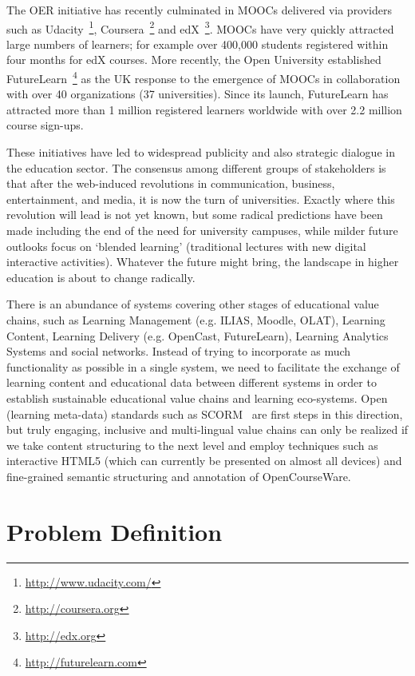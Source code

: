 \documentclass[ngerman,UKenglish,table]{scrbook}
\begin{document}
The OER initiative has recently culminated in MOOCs delivered via providers such as Udacity~\footnote{\url{http://www.udacity.com/}}, Coursera~\footnote{\url{http://coursera.org}} and edX~\footnote{\url{http://edx.org}}.
MOOCs have very quickly attracted large numbers of learners; for example over 400,000 students registered within four months for edX courses.
More recently, the Open University established FutureLearn~\footnote{\url{http://futurelearn.com}} as the UK response to the emergence of MOOCs in collaboration with over 40 organizations (37 universities).
Since its launch, FutureLearn has attracted more than 1 million registered learners worldwide with over 2.2 million course sign-ups. 

These initiatives have led to widespread publicity and also strategic dialogue in the education sector.
The consensus among different groups of stakeholders is that after the web-induced revolutions in communication, business, entertainment, and media, it is now the turn of universities.
Exactly where this revolution will lead is not yet known, but some radical predictions have been made including the end of the need for university campuses, while milder future outlooks focus on ‘blended learning’ (traditional lectures with new digital interactive activities).
Whatever the future might bring, the landscape in higher education is about to change radically.

There is an abundance of systems covering other stages of educational value chains, such as Learning Management (e.g. ILIAS, Moodle, OLAT), Learning Content, Learning Delivery (e.g. OpenCast, FutureLearn), Learning Analytics Systems and social networks.
Instead of trying to incorporate as much functionality as possible in a single system, we need to facilitate the exchange of learning content and educational data between different systems in order to establish sustainable educational value chains and learning eco-systems.
Open (learning meta-data) standards such as SCORM~\cite{scorm_specification2011} are first steps in this direction, but truly engaging, inclusive and multi-lingual value chains can only be realized if we take content structuring to the next level and employ techniques such as interactive HTML5 (which can currently be presented on almost all devices) and fine-grained semantic structuring and annotation of OpenCourseWare.


\section{Problem Definition}
\label{section:problem_definition}
\end{document}
